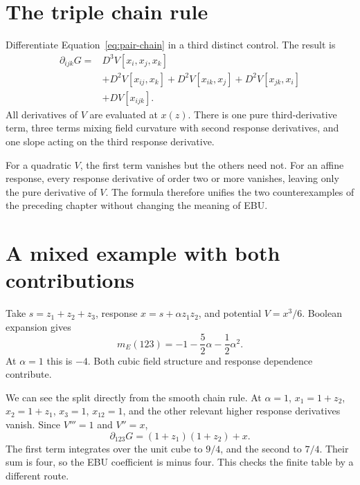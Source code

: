 \section{The triple chain rule}
Differentiate Equation~\ref{eq:pair-chain} in a third distinct control. The result is
\begin{align}\label{eq:triple-chain}
 \partial_{ijk}G={}&D^3V[x_i,x_j,x_k]\nonumber\\
 &+D^2V[x_{ij},x_k]+D^2V[x_{ik},x_j]
   +D^2V[x_{jk},x_i]\nonumber\\
 &+DV[x_{ijk}].
\end{align}
All derivatives of $V$ are evaluated at $x(z)$. There is one pure third-derivative term, three terms mixing field curvature with second response derivatives, and one slope acting on the third response derivative.

For a quadratic $V$, the first term vanishes but the others need not. For an affine response, every response derivative of order two or more vanishes, leaving only the pure derivative of $V$. The formula therefore unifies the two counterexamples of the preceding chapter without changing the meaning of EBU.


\section{A mixed example with both contributions}
Take $s=z_1+z_2+z_3$, response $x=s+\alpha z_1z_2$, and potential $V=x^3/6$. Boolean expansion gives
\begin{equation}\label{eq:mixed-triple}
 m_E(123)=-1-\frac52\alpha-\frac12\alpha^2.
\end{equation}
At $\alpha=1$ this is $-4$. Both cubic field structure and response dependence contribute.

We can see the split directly from the smooth chain rule. At $\alpha=1$, $x_1=1+z_2$, $x_2=1+z_1$, $x_3=1$, $x_{12}=1$, and the other relevant higher response derivatives vanish. Since $V'''=1$ and $V''=x$,
\begin{equation}
 \partial_{123}G=(1+z_1)(1+z_2)+x.
\end{equation}
The first term integrates over the unit cube to $9/4$, and the second to $7/4$. Their sum is four, so the EBU coefficient is minus four. This checks the finite table by a different route.


